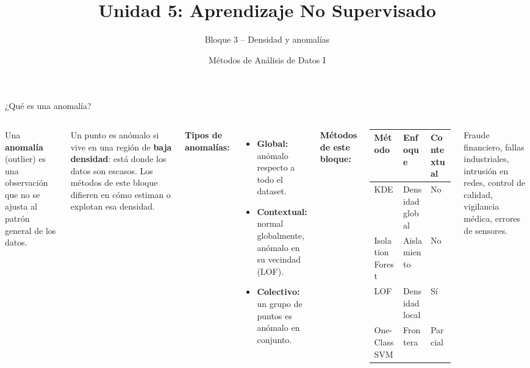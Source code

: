 \documentclass[aspectratio=169]{beamer}
\title[Unidad 5 -- Densidad y anomalías]{Unidad 5: Aprendizaje No Supervisado}
\subtitle{Bloque 3 -- Densidad y anomalías}
\author[MAD1 -- UNS]{Métodos de Análisis de Datos I}
\institute{Departamento de Matemática -- Universidad Nacional del Sur}
\date{}
\begin{document}

\begin{frame}
\titlepage
\end{frame}

\begin{frame}{¿Qué es una anomalía?}
\begin{columns}[T]
Una \textbf{anomalía} (outlier) es una observación que no se ajusta al patrón general de los datos.

\medskip
\begin{concepto}
Un punto es anómalo si vive en una región de \textbf{baja densidad}: está donde los datos son escasos. Los métodos de este bloque difieren en cómo estiman o explotan esa densidad.
\end{concepto}

\medskip
\textbf{Tipos de anomalías:}
\begin{itemize}
  \item \textbf{Global:} anómalo respecto a todo el dataset.
  \item \textbf{Contextual:} normal globalmente, anómalo en su vecindad (LOF).
  \item \textbf{Colectivo:} un grupo de puntos es anómalo en conjunto.
\end{itemize}

\textbf{Métodos de este bloque:}
\medskip
{\small
\begin{tabular}{lll}
\toprule
\textbf{Método} & \textbf{Enfoque} & \textbf{Contextual} \\
\midrule
KDE             & Densidad global  & No  \\
Isolation Forest & Aislamiento     & No  \\
LOF             & Densidad local   & Sí  \\
One-Class SVM   & Frontera         & Parcial \\
\bottomrule
\end{tabular}
}

\medskip
\begin{aplicacion}
Fraude financiero, fallas industriales, intrusión en redes, control de calidad, vigilancia médica, errores de sensores.
\end{aplicacion}
\end{columns}
\end{frame}
\end{document}
